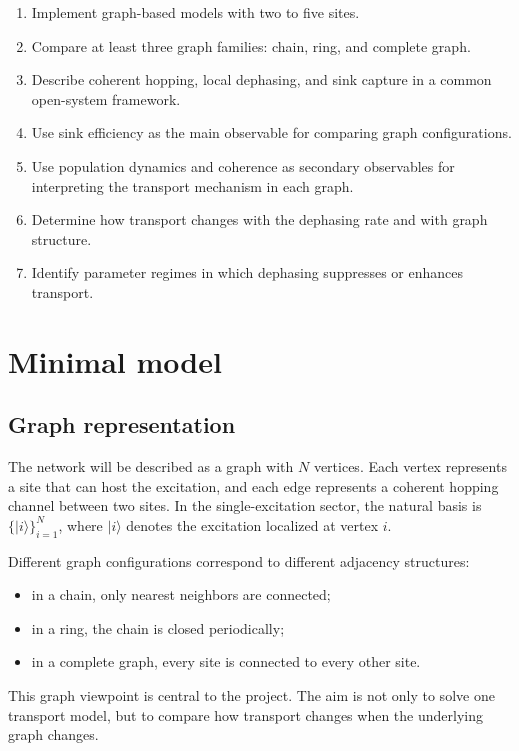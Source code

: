 \documentclass[11pt,a4paper]{article}
\begin{document}
\begin{enumerate}
  \item Implement graph-based models with two to five sites.
  \item Compare at least three graph families: chain, ring, and complete graph.
  \item Describe coherent hopping, local dephasing, and sink capture in a common
  open-system framework.
  \item Use sink efficiency as the main observable for comparing graph
  configurations.
  \item Use population dynamics and coherence as secondary observables for
  interpreting the transport mechanism in each graph.
  \item Determine how transport changes with the dephasing rate and with graph
  structure.
  \item Identify parameter regimes in which dephasing suppresses or enhances
  transport.
\end{enumerate}

\section{Minimal model}

\subsection{Graph representation}

The network will be described as a graph with $N$ vertices. Each vertex
represents a site that can host the excitation, and each edge represents a
coherent hopping channel between two sites. In the single-excitation sector, the
natural basis is $\{|i\rangle\}_{i=1}^{N}$, where $|i\rangle$ denotes the
excitation localized at vertex $i$.

Different graph configurations correspond to different adjacency structures:
\begin{itemize}
  \item in a chain, only nearest neighbors are connected;
  \item in a ring, the chain is closed periodically;
  \item in a complete graph, every site is connected to every other site.
\end{itemize}

This graph viewpoint is central to the project. The aim is not only to solve one
transport model, but to compare how transport changes when the underlying graph
changes.
\end{document}
